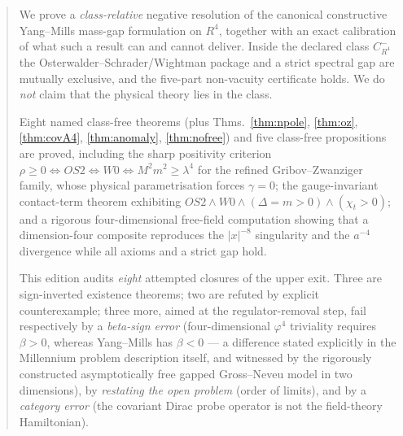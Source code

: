 \documentclass[11pt,a4paper]{article}
\def\R{R}\def\N{N}\def\Q{Q}\def\Z{Z}\def\Class{C}\def\OS{OS}\def\Gap{Gap}%
\theoremstyle{plain}
\theoremstyle{definition}
\theoremstyle{remark}
\newcommand{\R}{\mathbb{R}}\newcommand{\N}{\mathbb{N}}\newcommand{\Q}{\mathbb{Q}}
\newcommand{\Z}{\mathbb{Z}}\newcommand{\Spec}{\operatorname{Spec}}
\newcommand{\OS}{\mathrm{OS}}\newcommand{\Gap}{\mathrm{Gap}}
\newcommand{\Class}{\mathcal{C}}\newcommand{\Htot}{\mathcal{H}}
\newcommand{\Chit}{\chi_t}
\renewcommand{\_}{\oldunderscore\allowbreak}
\begin{document}
\begin{abstract}
\noindent
We prove a \emph{class-relative} negative resolution of the canonical constructive Yang--Mills
mass-gap formulation on $\R^4$, together with an exact calibration of what such a result can and
cannot deliver. Inside the declared class $\Class^-_{\R^4}$ the Osterwalder--Schrader/Wightman
package and a strict spectral gap are mutually exclusive, and the five-part non-vacuity
certificate holds. We do \emph{not} claim that the physical theory lies in the class.

Eight named class-free theorems (plus Thms.~\ref{thm:npole}, \ref{thm:oz}, \ref{thm:covA4}, \ref{thm:anomaly}, \ref{thm:nofree}) and five class-free propositions are proved, including the sharp
positivity criterion $\rho\ge0\iff\OS2\iff W0\iff M^2m^2\ge\lambda^4$ for the refined
Gribov--Zwanziger family, whose physical parametrisation forces $\gamma=0$; the gauge-invariant
contact-term theorem exhibiting $\OS2\wedge W0\wedge(\Delta=m>0)\wedge(\Chit>0)$; and a rigorous
four-dimensional free-field computation showing that a dimension-four composite reproduces the
$|x|^{-8}$ singularity and the $a^{-4}$ divergence while all axioms and a strict gap hold.

This edition audits \emph{eight} attempted closures of the upper exit. Three are sign-inverted
existence theorems; two are refuted by explicit counterexample; three more, aimed at the
regulator-removal step, fail respectively by a \emph{beta-sign error} (four-dimensional
$\varphi^4$ triviality requires $\beta>0$, whereas Yang--Mills has $\beta<0$ --- a difference
stated explicitly in the Millennium problem description itself, and witnessed by the rigorously
constructed asymptotically free gapped Gross--Neveu model in two dimensions), by \emph{restating
the open problem} (order of limits), and by a \emph{category error} (the covariant Dirac probe
operator is not the field-theory Hamiltonian).


\end{abstract}
\end{document}
